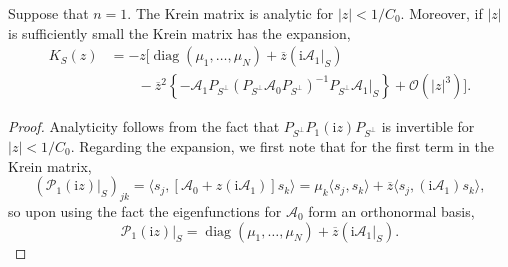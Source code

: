 \documentclass[review,onefignum,onetabnum]{siamart171218}
\def\diag{\mathop\mathrm{diag}\nolimits}
\newcommand{\rmi}{\mathrm{i}}
\newcommand{\calA}{\mathcal{A}}
\newcommand{\calO}{\mathcal{O}}
\newcommand{\calP}{\mathcal{P}}
\newcommand{\vK}{\bm{\mathit{K}}}
\begin{document}
\begin{lemma}\label{l:52}
Suppose that $n=1$. The Krein matrix is analytic for $|z|<1/C_0$. Moreover, if $|z|$ is sufficiently small the Krein matrix has the expansion,
\begin{equation}\label{KSz}
\begin{aligned}
\vK_S(z)&=-z\Big[\diag(\mu_1,\dots,\mu_N)+\overline{z}\left(\rmi\calA_1|_S\right)\\
&\qquad-
\overline{z}^2\left\{-
\calA_1P_{S^\perp}\left(P_{S^\perp}\calA_0P_{S^\perp}\right)^{-1}P_{S^\perp}\calA_1|_S\right\}
+\calO(|z|^3)\Big].
\end{aligned}
\end{equation}
\end{lemma}

\begin{proof}
Analyticity follows from the fact that $P_{S^\perp}P_1(\rmi z)P_{S^\perp}$ is invertible for $|z|<1/C_0$.
Regarding the expansion, we first note that for the first term in the Krein matrix,
\[
\left(\calP_1(\rmi z)|_S\right)_{jk}=\langle s_j,[\calA_0+z(\rmi\calA_1)]s_k\rangle=
\mu_k\langle s_j,s_k\rangle+\overline{z}\langle s_j,(\rmi\calA_1)s_k\rangle,
\]
so upon using the fact the eigenfunctions for $\calA_0$ form an orthonormal basis,
\[
\calP_1(\rmi z)|_S=\diag(\mu_1,\dots,\mu_N)+\overline{z}\left(\rmi\calA_1|_S\right).
\]


\end{proof}
\end{document}
